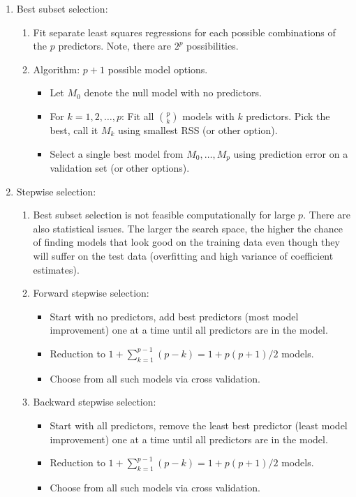 \documentclass{article}
\begin{document}
\begin{enumerate}
\item Best subset selection:
\begin{enumerate}
\item Fit separate least squares regressions for each possible combinations of the $p$ predictors. Note, there are $2^p$ possibilities.
\item Algorithm: $p+1$ possible model options.
\begin{itemize}
\item Let $M_0$ denote the null model with no predictors.
\item For $k=1,2,\dots,p$: Fit all ${p}\choose{k}$ models with $k$ predictors. Pick the best, call it $M_k$ using smallest RSS (or other option).
\item Select a single best model from $M_0, \dots, M_p$ using prediction error on a validation set (or other options).
\end{itemize}
\end{enumerate}

\item Stepwise selection:
\begin{enumerate}
\item Best subset selection is not feasible computationally for large $p$. There are also statistical issues. The larger the search space, the higher the chance of finding models that look good on the training data even though they will suffer on the test data (overfitting and high variance of coefficient estimates).

\item Forward stepwise selection:
\begin{itemize}
\item Start with no predictors, add best predictors (most model improvement) one at a time until all predictors are in the model.
\item Reduction to $1 + \sum_{k=1}^{p-1}(p-k) = 1 + p(p+1)/2$ models.
\item Choose from all such models via cross validation.
\end{itemize}

\item Backward stepwise selection:
\begin{itemize}
\item Start with all predictors, remove the least best predictor (least model improvement) one at a time until all predictors are in the model.
\item Reduction to $1 + \sum_{k=1}^{p-1}(p-k) = 1 + p(p+1)/2$ models.
\item Choose from all such models via cross validation.
\end{itemize}


\end{enumerate}
\end{enumerate}
\end{document}
